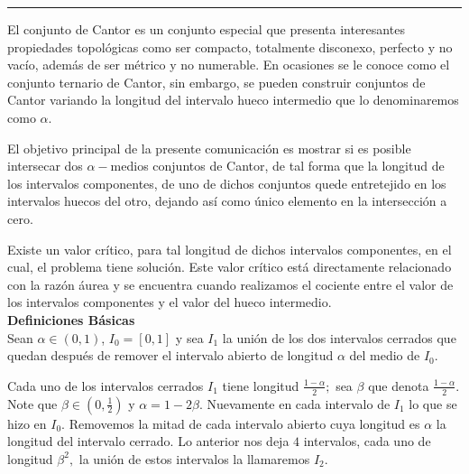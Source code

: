\begin{titlepage}
\begin{minipage}{0.5\linewidth}
\begin{minipage}{0.45\linewidth}
    \begin{flushright}
        \printauthor
    \end{flushright}
\end{minipage} \hspace{0pt}
%
\begin{minipage}{0.02\linewidth}
      \color{ptctitle} \rule{1pt}{350pt}
\end{minipage} 
\end{minipage}
\hspace*{-4.5cm}
%
\begin{minipage}{0.85\linewidth}
\begin{minipage}{0.85\linewidth}
\footnotesize
\vspace{5pt}
    \begin{resumen} 
    
El conjunto de Cantor es un conjunto especial que presenta
interesantes propiedades topol\'ogicas como ser compacto, totalmente
disconexo, perfecto y no vac\'io, adem\'as de ser m\'etrico y no
numerable. En ocasiones se le conoce como el conjunto ternario de
Cantor, sin embargo, se pueden construir conjuntos de Cantor
variando la longitud del intervalo hueco intermedio que lo
denominaremos como $\alpha.$

El objetivo principal de la presente comunicaci\'on es mostrar si es
posible intersecar dos $\alpha-$medios conjuntos de Cantor, de tal
forma que la longitud de los intervalos componentes, de uno de
dichos conjuntos quede entretejido en los intervalos huecos del
otro, dejando as\'i como \'unico elemento en la intersecci\'on a cero.

Existe un valor cr\'itico, para tal longitud de dichos intervalos
componentes, en el cual, el problema tiene soluci\'on. Este valor
cr\'itico est\'a directamente relacionado con la raz\'on \'aurea y se
encuentra cuando realizamos el cociente entre el valor de los
intervalos componentes y el valor del hueco intermedio.
\\[10pt]
{\bf\large Definiciones B\'asicas}\\[10pt]
Sean $\alpha\in(0,1)$, $I_0=[0,1]$ y sea $I_1$ la uni\'on de los dos
intervalos cerrados que quedan despu\'es de remover el intervalo
abierto de longitud $\alpha$ del medio de $I_0$.

Cada uno de los intervalos cerrados $I_1$ tiene longitud
$\frac{1-\alpha}{2};$ sea $\beta$ que denota $\frac{1-\alpha}{2}.$
Note que $\beta\in(0,\frac{1}{2})$ y $\alpha=1-2\beta.$  Nuevamente
en cada intervalo de $I_1$ lo que se hizo en $I_0.$  Removemos la
mitad de cada intervalo abierto cuya longitud es $\alpha$ la
longitud del intervalo cerrado.  Lo anterior nos deja $4$
intervalos, cada uno de longitud $\beta^2,$ la uni\'on de estos
intervalos la llamaremos $I_2.$


\end{resumen}
\end{minipage}
\end{minipage}
\end{titlepage}

